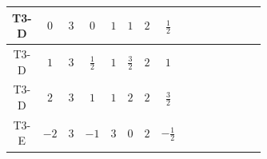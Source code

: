 \documentclass[8pt]{article}
\begin{document}
\begin{landscape}
\begin{longtable}{@{}cccccccc >{\raggedright\arraybackslash}p{0.21\linewidth} >{\raggedright\arraybackslash}p{0.21\linewidth} >{\raggedright\arraybackslash}p{0.21\linewidth}@{}}
\midrule
T3-D & $0$ & $3$ & $0$ & $1$ & $1$ & $2$ & $\frac{1}{2}$ & \scriptsize\adjustbox{max width=\linewidth}{$\begin{gathered} +D_{\mu _1}\left(S_2\right){}^{\dagger } D_{\mu _1}\left(S_2\right)\end{gathered}$} & \scriptsize\adjustbox{max width=\linewidth}{$\begin{gathered} -\overline{F_{j_1,r_1}}\, F_{j_1,r_1} M_F\end{gathered}$} & \scriptsize\adjustbox{max width=\linewidth}{$\begin{gathered} +i \overline{F_{j_1,r_1}}\, \gamma ^{\mu _1}\, D_{\mu _1}\left(F_{j_1,r_1}\right)\end{gathered}$} \\
\midrule
T3-D & $1$ & $3$ & $\frac{1}{2}$ & $1$ & $\frac{3}{2}$ & $2$ & $1$ & \scriptsize\adjustbox{max width=\linewidth}{$\begin{gathered} +D_{\mu _1}\left(S_2\right){}^{\dagger } D_{\mu _1}\left(S_2\right)\end{gathered}$} & \scriptsize\adjustbox{max width=\linewidth}{$\begin{gathered} -\overline{F_{j_1,r_1}}\, F_{j_1,r_1} M_F\end{gathered}$} & \scriptsize\adjustbox{max width=\linewidth}{$\begin{gathered} +i \overline{F_{j_1,r_1}}\, \gamma ^{\mu _1}\, D_{\mu _1}\left(F_{j_1,r_1}\right)\end{gathered}$} \\
\midrule
T3-D & $2$ & $3$ & $1$ & $1$ & $2$ & $2$ & $\frac{3}{2}$ & \scriptsize\adjustbox{max width=\linewidth}{$\begin{gathered} +D_{\mu _1}\left(S_2\right){}^{\dagger } D_{\mu _1}\left(S_2\right)\end{gathered}$} & \scriptsize\adjustbox{max width=\linewidth}{$\begin{gathered} -\overline{F_{j_1,r_1}}\, F_{j_1,r_1} M_F\end{gathered}$} & \scriptsize\adjustbox{max width=\linewidth}{$\begin{gathered} +i \overline{F_{j_1,r_1}}\, \gamma ^{\mu _1}\, D_{\mu _1}\left(F_{j_1,r_1}\right)\end{gathered}$} \\
\midrule
T3-E & $-2$ & $3$ & $-1$ & $3$ & $0$ & $2$ & $-\frac{1}{2}$ & \scriptsize\adjustbox{max width=\linewidth}{$\begin{gathered} +D_{\mu _1}\left(S_{2,j_1}\right){}^{\dagger } D_{\mu _1}\left(S_{2,j_1}\right)\end{gathered}$} & \scriptsize\adjustbox{max width=\linewidth}{$\begin{gathered} -\overline{F_{j_1,r_1}}\, F_{j_1,r_1} M_F\end{gathered}$} & \scriptsize\adjustbox{max width=\linewidth}{$\begin{gathered} +i \overline{F_{j_1,r_1}}\, \gamma ^{\mu _1}\, D_{\mu _1}\left(F_{j_1,r_1}\right)\end{gathered}$} \\

\end{longtable}
\end{landscape}
\end{document}
